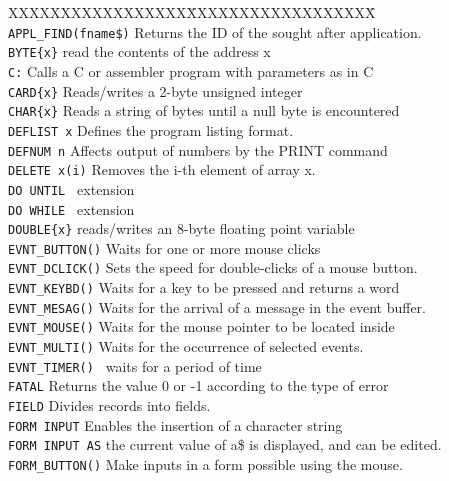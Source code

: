 \begin{tabbing}
XXXXXXXXXXXXXXXXX\=XXXXXXXXXXXXXXXXXX\=\kill\\
\verb|APPL_FIND(fname$)|\> Returns the ID of the sought after application.\\
\verb|BYTE{x}|\>		read the contents of the address x\\
\verb|C:|\>	      Calls a C or assembler program with parameters as in C\\
\verb|CARD{x}|\>	      Reads/writes a 2-byte unsigned integer\\
\verb|CHAR{x}|\>	      Reads a string of bytes until a null byte is  encountered\\
\verb|DEFLIST x|\>       Defines the program listing format.\\
\verb|DEFNUM n|\>        Affects  output  of numbers by the PRINT  command\\
\verb|DELETE x(i)|\>     Removes  the i-th element of array x.\\
\verb|DO UNTIL |\>      extension\\
\verb|DO WHILE |\>      extension\\
\verb|DOUBLE{x}|\>       reads/writes  an  8-byte floating point  variable\\
\verb|EVNT_BUTTON()|\>   Waits for one or more mouse clicks\\
\verb|EVNT_DCLICK()|\>   Sets the speed for double-clicks of a mouse button.\\
\verb|EVNT_KEYBD()|\>    Waits for  a key to be pressed and  returns  a  word\\
\verb|EVNT_MESAG()|\>    Waits for the arrival of a message in the event buffer.\\
\verb|EVNT_MOUSE()|\>    Waits for  the  mouse pointer to  be  located  inside \\
\verb|EVNT_MULTI()|\>    Waits for the occurrence of selected  events.\\
\verb|EVNT_TIMER() |\>   waits for a period  of  time\\
\verb|FATAL|\>	      Returns the value 0 or -1 according to the type of error\\
\verb|FIELD|\>	      Divides records into fields.\\
\verb|FORM INPUT|\>      Enables the insertion of a character string\\
\verb|FORM INPUT AS|\>   the current value of a\$ is displayed, and can be edited.\\
\verb|FORM_BUTTON()|\>   Make inputs in a form possible using the mouse.\\

\end{tabbing}
